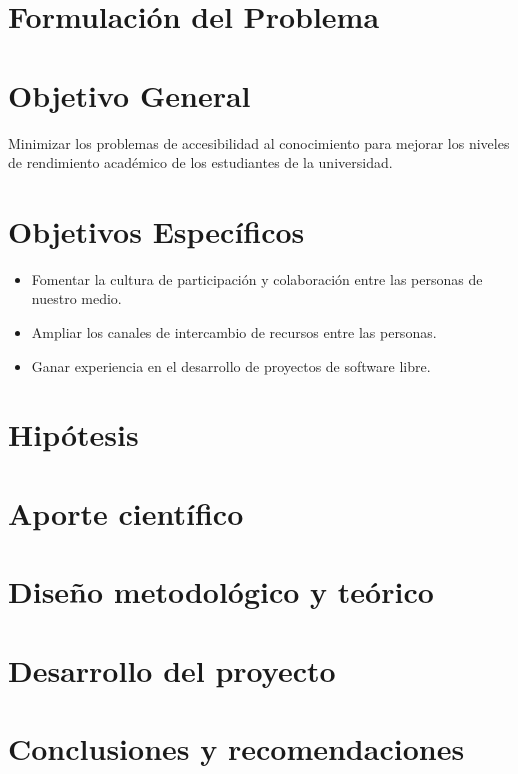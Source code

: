\documentclass[letter,11pt,oneside,spanish]{article}
\begin{document}
\section{Formulación del Problema}

\section{Objetivo General}
Minimizar los problemas de accesibilidad al conocimiento para mejorar los niveles de rendimiento
académico de los estudiantes de la universidad.

\section{Objetivos Específicos}
\begin{itemize}
\item Fomentar la cultura de participación y colaboración entre las personas de nuestro medio.
\item Ampliar los canales de intercambio de recursos entre las personas.
\item Ganar experiencia en el desarrollo de proyectos de software libre.
\end{itemize}

\section{Hipótesis}
\section{Aporte científico}
\section{Diseño metodológico y teórico}
\section{Desarrollo del proyecto}
\section{Conclusiones y recomendaciones}
\end{document}
